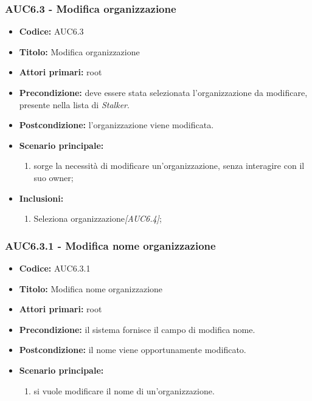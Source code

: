 \documentclass[casi-duso]{subfiles}
\begin{document}
\subsubsection{AUC6.3 - Modifica organizzazione}%
\label{subsub:AUC6.3}
\begin{itemize}
  \item \textbf{Codice:} AUC6.3
  \item \textbf{Titolo:} Modifica organizzazione
  \item \textbf{Attori primari:} root
  \item \textbf{Precondizione:} deve essere stata selezionata l'organizzazione da modificare, presente nella lista di \emph{Stalker}.
  \item \textbf{Postcondizione:} l'organizzazione viene modificata.
  \item \textbf{Scenario principale:}
  \begin{enumerate}
    \item sorge la necessità di modificare un'organizzazione, senza interagire con il suo owner;
  \end{enumerate}
  \item \textbf{Inclusioni:}
  \begin{enumerate}
    \item Seleziona organizzazione\emph{[AUC6.4]};
  \end{enumerate}
\end{itemize}

\subsubsection{AUC6.3.1 - Modifica nome organizzazione}%
\label{subsub:AUC6.3.1}
\begin{itemize}
  \item \textbf{Codice:} AUC6.3.1
  \item \textbf{Titolo:} Modifica nome organizzazione
  \item \textbf{Attori primari:} root
  \item \textbf{Precondizione:} il sistema fornisce il campo di modifica nome.
  \item \textbf{Postcondizione:} il nome viene opportunamente modificato.
  \item \textbf{Scenario principale:}
  \begin{enumerate}
    \item si vuole modificare il nome di un'organizzazione.
  \end{enumerate}
\end{itemize}
\end{document}
